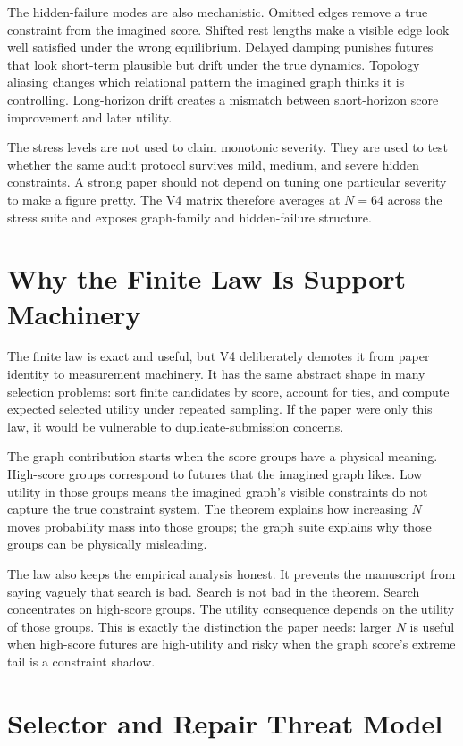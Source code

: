 \documentclass{article}
\begin{document}
The hidden-failure modes are also mechanistic.  Omitted edges remove a true
constraint from the imagined score.  Shifted rest lengths make a visible edge
look well satisfied under the wrong equilibrium.  Delayed damping punishes
futures that look short-term plausible but drift under the true dynamics.
Topology aliasing changes which relational pattern the imagined graph thinks it
is controlling.  Long-horizon drift creates a mismatch between short-horizon
score improvement and later utility.

The stress levels are not used to claim monotonic severity.  They are used to
test whether the same audit protocol survives mild, medium, and severe hidden
constraints.  A strong paper should not depend on tuning one particular severity
to make a figure pretty.  The V4 matrix therefore averages at \(N=64\) across
the stress suite and exposes graph-family and hidden-failure structure.

\section{Why the Finite Law Is Support Machinery}

The finite law is exact and useful, but V4 deliberately demotes it from paper
identity to measurement machinery.  It has the same abstract shape in many
selection problems: sort finite candidates by score, account for ties, and
compute expected selected utility under repeated sampling.  If the paper were
only this law, it would be vulnerable to duplicate-submission concerns.

The graph contribution starts when the score groups have a physical meaning.
High-score groups correspond to futures that the imagined graph likes.  Low
utility in those groups means the imagined graph's visible constraints do not
capture the true constraint system.  The theorem explains how increasing \(N\)
moves probability mass into those groups; the graph suite explains why those
groups can be physically misleading.

The law also keeps the empirical analysis honest.  It prevents the manuscript
from saying vaguely that search is bad.  Search is not bad in the theorem.
Search concentrates on high-score groups.  The utility consequence depends on
the utility of those groups.  This is exactly the distinction the paper needs:
larger \(N\) is useful when high-score futures are high-utility and risky when
the graph score's extreme tail is a constraint shadow.

\section{Selector and Repair Threat Model}
\end{document}
